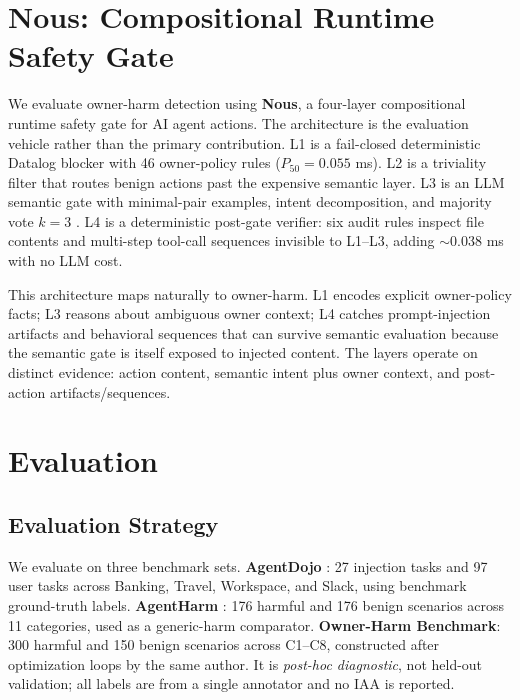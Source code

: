 \documentclass{article}
\theoremstyle{definition}
\begin{document}
\section{Nous: Compositional Runtime Safety Gate}
\label{sec:nous}

We evaluate owner-harm detection using \textbf{Nous}, a four-layer
compositional runtime safety gate for AI agent actions. The architecture is
the evaluation vehicle rather than the primary contribution. L1 is a
fail-closed deterministic Datalog blocker with 46 owner-policy rules
($P_{50}=0.055$ ms). L2 is a triviality filter that routes benign actions
past the expensive semantic layer. L3 is an LLM semantic gate with
minimal-pair examples, intent decomposition, and majority vote $k=3$
\citep{wang2022selfconsistency}. L4 is a deterministic post-gate verifier:
six audit rules inspect file contents and multi-step tool-call sequences
invisible to L1--L3, adding $\sim$0.038 ms with no LLM cost.

This architecture maps naturally to owner-harm. L1 encodes explicit
owner-policy facts; L3 reasons about ambiguous owner context; L4 catches
prompt-injection artifacts and behavioral sequences that can survive
semantic evaluation because the semantic gate is itself exposed to
injected content. The layers operate on distinct evidence: action content,
semantic intent plus owner context, and post-action artifacts/sequences.

\section{Evaluation}
\label{sec:eval}

\subsection{Evaluation Strategy}
\label{subsec:strategy}

We evaluate on three benchmark sets. \textbf{AgentDojo}
\cite{debenedetti2024agentdojo}: 27 injection tasks and 97 user tasks
across Banking, Travel, Workspace, and Slack, using benchmark
ground-truth labels. \textbf{AgentHarm}
\cite{andriushchenko2025agentharm}: 176 harmful and 176 benign scenarios
across 11 categories, used as a generic-harm comparator. \textbf{Owner-Harm
Benchmark}: 300 harmful and 150 benign scenarios across C1--C8,
constructed after optimization loops by the same author. It is
\emph{post-hoc diagnostic}, not held-out validation; all labels are from a
single annotator and no IAA is reported.
\end{document}
